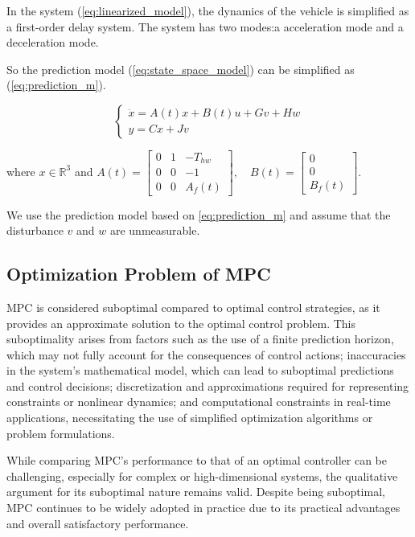 \documentclass{article}
\numberwithin{equation}{section}
\begin{document}
In the system (\ref{eq:linearized_model}), the dynamics of the vehicle is
simplified as a first-order delay system. The system has two modes:a
acceleration mode and a deceleration mode.

So the prediction model (\ref{eq:state_space_model}) can be simplified as
(\ref{eq:prediction_m}).

\begin{equation}
    \left\{\begin{array}{l}\label{eq:prediction_m}
        \dot{x}=A(t)x+B(t)u+Gv+Hw \\
        y=Cx+Jv
    \end{array}\right.
\end{equation}

\noindent where $x \in \mathbb{R}^3$ and $A(t)=\left[\begin{array}{ccc}
            0 & 1 & -T_{h w} \\
            0 & 0 & -1       \\
            0 & 0 & A_{f}(t)
        \end{array}\right], \quad B(t)=\left[\begin{array}{c}
            0 \\
            0 \\
            B_{f}(t)
        \end{array}\right]$.

We use the prediction model based on \ref{eq:prediction_m} and assume that the
disturbance $v$ and $w$ are unmeasurable.
\subsection{Optimization Problem of MPC}

MPC is considered suboptimal compared to optimal control strategies, as it
provides an approximate solution to the optimal control problem. This
suboptimality arises from factors such as the use of a finite prediction
horizon, which may not fully account for the consequences of control actions;
inaccuracies in the system's mathematical model, which can lead to suboptimal
predictions and control decisions; discretization and approximations required
for representing constraints or nonlinear dynamics; and computational
constraints in real-time applications, necessitating the use of simplified
optimization algorithms or problem formulations.

While comparing MPC's performance to that of an optimal controller can be
challenging, especially for complex or high-dimensional systems, the
qualitative argument for its suboptimal nature remains valid. Despite being
suboptimal, MPC continues to be widely adopted in practice due to its practical
advantages and overall satisfactory performance.
\end{document}
